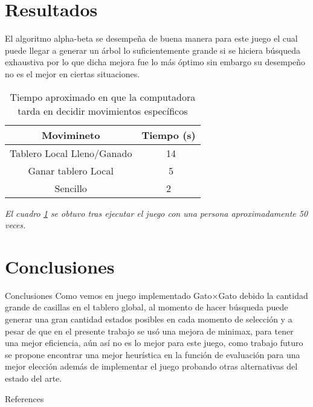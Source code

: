 \documentclass{beamer}
\begin{document}
\section{Resultados}
\begin{frame}
El algoritmo alpha-beta se desempeña de buena manera para este juego el cual puede llegar a generar un árbol lo suficientemente grande si se hiciera búsqueda exhaustiva por lo que dicha mejora fue lo más óptimo sin embargo su desempeño no es el mejor en ciertas situaciones.
\begin{table}
\begin{center}
\begin{tabular}{| c | c |}
Movimineto & Tiempo (s) \\ \hline
Tablero Local Lleno/Ganado & ~14  \\
Ganar tablero Local & ~5\\
Sencillo &  2 \\ \hline
\end{tabular}
\caption{Tiempo aproximado en que la computadora tarda en decidir movimientos específicos}
\label{tab:1}
\end{center}
\end{table}
\textit{El cuadro \ref{tab:1} se obtuvo tras ejecutar el juego con una persona aproximadamente 50 veces.}
\end{frame}

%
%
\section{Conclusiones}
\begin{frame}{Conclusiones}
  \centering
Como vemos en juego implementado Gato×Gato debido la cantidad grande de casillas en el tablero global, al momento de hacer búsqueda puede generar una gran cantidad estados posibles en cada momento de selección y a pesar de que en el presente trabajo se usó una mejora de minimax, para tener una mejor eficiencia, aún así no es lo mejor para este juego, como trabajo futuro se propone encontrar una mejor heurística en la función de evaluación para una mejor elección además de implementar el juego probando otras alternativas del estado del arte.

\end{frame}

\begin{frame}[allowframebreaks]{References}


\end{frame}

\end{document}
